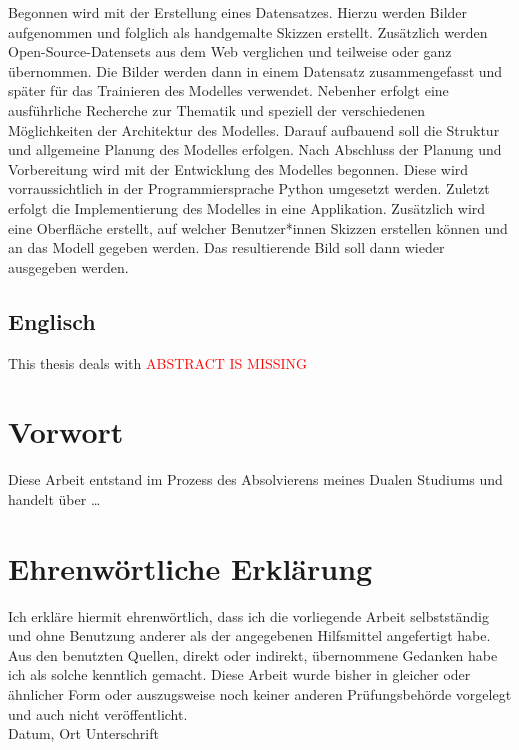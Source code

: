 \documentclass[12pt,a4paper]{article}
\begin{document}
	Begonnen wird mit der Erstellung eines Datensatzes. 
	Hierzu werden Bilder aufgenommen und folglich als handgemalte Skizzen erstellt. 
	Zusätzlich werden Open-Source-Datensets aus dem Web verglichen und teilweise oder ganz übernommen. 
	Die Bilder werden dann in einem Datensatz zusammengefasst und später für das Trainieren des Modelles verwendet. 
	Nebenher erfolgt eine ausführliche Recherche zur Thematik und speziell der verschiedenen Möglichkeiten der Architektur des Modelles. 
	Darauf aufbauend soll die Struktur und allgemeine Planung des Modelles erfolgen. 
	Nach Abschluss der Planung und Vorbereitung wird mit der Entwicklung des Modelles begonnen. 
	Diese wird vorraussichtlich in der Programmiersprache Python umgesetzt werden. 
	Zuletzt erfolgt die Implementierung des Modelles in eine Applikation. 
	Zusätzlich wird eine Oberfläche erstellt, auf welcher Benutzer*innen Skizzen erstellen können und an das Modell gegeben werden. 
	Das resultierende Bild soll dann wieder ausgegeben werden.

\subsection*{Englisch}
	This thesis deals with \textcolor{red}{ABSTRACT IS MISSING}

\newpage
\section*{Vorwort}
	Diese Arbeit entstand im Prozess des Absolvierens meines Dualen Studiums und handelt über \dots

\newpage
\section*{Ehrenwörtliche Erklärung}
	Ich erkläre hiermit ehrenwörtlich, dass ich die vorliegende Arbeit selbstständig und ohne Benutzung anderer als der angegebenen Hilfsmittel angefertigt habe. Aus den benutzten Quellen, direkt oder indirekt, übernommene Gedanken habe ich als solche kenntlich gemacht. Diese Arbeit wurde bisher in gleicher oder ähnlicher Form oder auszugsweise noch keiner anderen Prüfungsbehörde vorgelegt und auch nicht veröffentlicht.
	\vspace{1cm}
	\newline
	\noindent {} \hfill {}\\
	{\noindent \small Datum, Ort \hfill Unterschrift}
\end{document}
